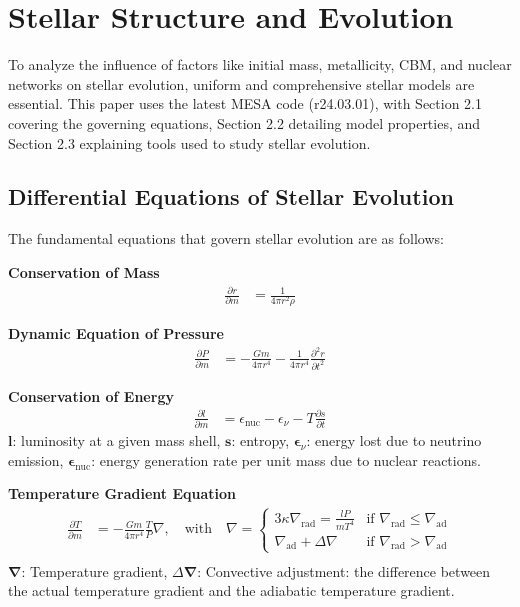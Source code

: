 \section{Stellar Structure and Evolution}
To analyze the influence of factors like initial mass, metallicity, CBM, and nuclear networks on stellar evolution, uniform and comprehensive stellar models are essential. This paper uses the latest MESA code (r24.03.01), with Section 2.1 covering the governing equations, Section 2.2 detailing model properties, and Section 2.3 explaining tools used to study stellar evolution.
\subsection{Differential Equations of Stellar Evolution}
The fundamental equations that govern stellar evolution are as follows:

\vspace{1em}
\noindent
\textbf{Conservation of Mass}
\begin{align*}
\frac{\partial r}{\partial m} &= \frac{1}{4\pi r^2 \rho} \tag{2.1} 
\end{align*}


\noindent
\textbf{Dynamic Equation of Pressure}
\begin{align*}
\frac{\partial P}{\partial m} &= -\frac{G m}{4\pi r^4} - \frac{1}{4\pi r^4} \frac{\partial^2 r}{\partial t^2} \tag{2.2}
\end{align*}

\noindent
\textbf{Conservation of Energy}
\begin{align*}
\frac{\partial l}{\partial m} &= \epsilon_{\text{nuc}} - \epsilon_{\nu} - T \frac{\partial s}{\partial t} \tag{2.3} 
\end{align*}
\(\mathbf{l}\): luminosity at a given mass shell, \(\mathbf{s}\): entropy, \(\boldsymbol{\epsilon}_{\nu}\): energy lost due to neutrino emission, \(\boldsymbol{\epsilon}_{\text{nuc}}\): energy generation rate per unit mass due to nuclear reactions.

\vspace{1em}
\noindent
\textbf{Temperature Gradient Equation}
\begin{align*}
\frac{\partial T}{\partial m} &= -\frac{G m}{4\pi r^4} \frac{T}{P} \nabla, \quad \text{with} \quad \nabla = \begin{cases} 3\kappa \nabla_{\text{rad}} = \frac{l P}{m T^4} & \text{if }\nabla_{\text{rad}} \leq \nabla_{\text{ad}} \\ 
\nabla_{\text{ad}} + \Delta \nabla & \text{if } \nabla_{\text{rad}} > \nabla_{\text{ad}} 
\end{cases} \tag{2.4} \\
\end{align*}
\(\mathbf{\nabla}\): Temperature gradient, \(\Delta \mathbf{\nabla}\): Convective adjustment: the difference between the actual temperature gradient and the adiabatic temperature gradient.


